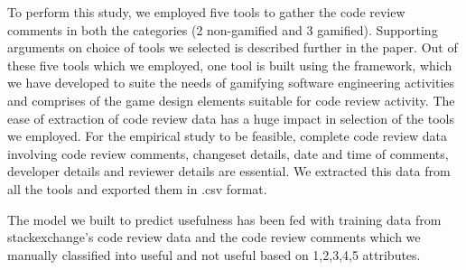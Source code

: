 \documentclass[conference]{IEEEtran}
\begin{document}
To perform this study, we employed five tools to gather the code review comments in both the categories (2 non-gamified and 3 gamified). Supporting arguments on choice of tools we selected is described further in the paper. Out of these five tools which we employed, one tool is built using the framework, which we have developed to suite the needs of gamifying software engineering activities and comprises of the game design elements\cite{Adams2009} suitable for code review activity. The ease of extraction of code review data has a huge impact in selection of the tools we employed. For the empirical study to be feasible, complete code review data involving code review comments, changeset details, date and time of comments, developer details and reviewer details are essential. We extracted this data from all the tools and exported them in .csv format. 


The model we built to predict usefulness has been fed with training data from stackexchange's code review data and the code review comments which we manually classified into useful and not useful based on 1,2,3,4,5 attributes.

\end{document}
